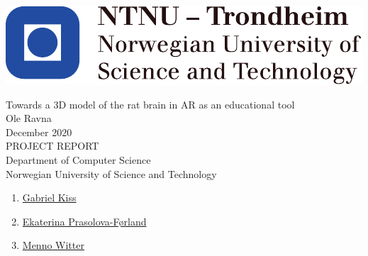 
\thispagestyle{empty}
\includegraphics[scale=1.1]{fig/NTNU}
\mbox{}\\[6pc]
\begin{center}
\Huge{Towards a 3D model of the rat brain in AR as an educational tool}\\[2pc]

\Large{Ole Ravna}\\[1pc]
\large{December 2020}\\[2pc]

PROJECT REPORT\\
Department of Computer Science\\
Norwegian University of Science and Technology
\end{center}
\vfill


\begin{enumerate}[label={Supervisor \arabic*:}]
    \item \href{https://www.ntnu.no/ansatte/gabriel.kiss}{Gabriel Kiss}
    \item \href{https://www.ntnu.no/ansatte/ekaterip}{Ekaterina Prasolova-Førland}
    \item \href{https://www.ntnu.no/ansatte/menno.witter}{Menno Witter}
\end{enumerate}


